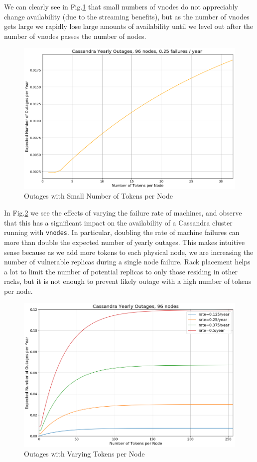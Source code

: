 \documentclass{article}
\begin{document}
We can clearly see in Fig.\ref{fig:outages_small_vnodes} that small numbers of vnodes do not appreciably change availability (due to the streaming benefits), but as the number of vnodes gets large we rapidly lose large amounts of availability until we level out after the number of vnodes passes the number of nodes.

\begin{figure}[h!]
    \centering
    \includegraphics[width=1.0\textwidth]{images/outages_vnodes_small.png}
    \caption{Outages with Small Number of Tokens per Node}
    \label{fig:outages_small_vnodes}
\end{figure}

In Fig.\ref{fig:outages_all_vnodes} we see the effects of varying the failure rate of machines, and observe that this has a significant impact on the availability of a Cassandra cluster running with \texttt{vnodes}. In particular, doubling the rate of machine failures can more than double the expected number of yearly outages. This makes intuitive sense because as we add more tokens to each physical node, we are increasing the number of vulnerable replicas during a single node failure. Rack placement helps a lot to limit the number of potential replicas to only those residing in other racks, but it is not enough to prevent likely outage with a high number of tokens per node.
\begin{figure}[h!]
    \centering
    \includegraphics[width=1.0\textwidth]{images/outages_all_vnodes.png}
    \caption{Outages with Varying Tokens per Node}
    \label{fig:outages_all_vnodes}
\end{figure}
\end{document}
